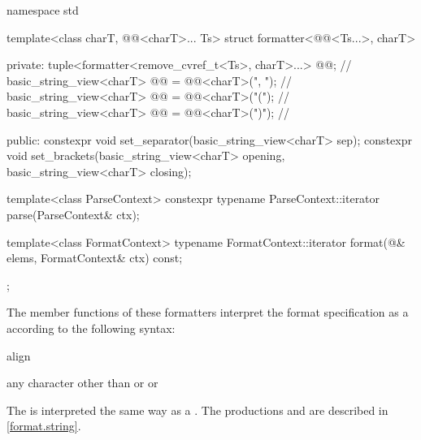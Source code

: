 %
\begin{codeblock}
namespace std {
  template<class charT, @@<charT>... Ts>
  struct formatter<@@<Ts...>, charT> {
  private:
    tuple<formatter<remove_cvref_t<Ts>, charT>...> @@;               // \expos
    basic_string_view<charT> @@ = @@<charT>(", ");      // \expos
    basic_string_view<charT> @@ = @@<charT>("("); // \expos
    basic_string_view<charT> @@ = @@<charT>(")"); // \expos

  public:
    constexpr void set_separator(basic_string_view<charT> sep);
    constexpr void set_brackets(basic_string_view<charT> opening,
                                basic_string_view<charT> closing);

    template<class ParseContext>
      constexpr typename ParseContext::iterator
        parse(ParseContext& ctx);

    template<class FormatContext>
      typename FormatContext::iterator
        format(@\seebelow@& elems, FormatContext& ctx) const;
  };
}
\end{codeblock}

\pnum
The  member functions of these formatters
interpret the format specification as
a  according to the following syntax:

\begin{ncbnf}
\br
      
\end{ncbnf}

\begin{ncbnf}
\br
     align
\end{ncbnf}

\begin{ncbnf}
\br
    \textnormal{any character other than} \terminal{\{} \textnormal{or} \terminal{\}} \textnormal{or} \terminal{:}
\end{ncbnf}

\begin{ncbnf}
\br
    \br
\end{ncbnf}

\pnum
The  is interpreted the same way as
a .
The productions  and 
are described in \ref{format.string}.

